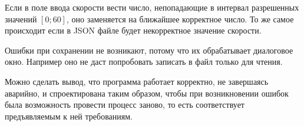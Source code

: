 \documentclass[a4paper,12pt]{article}
\begin{document}
  Если в поле ввода скорости вести число, непопадающие в интервал разрешенных значений $[0; 60]$,
  оно заменяется на ближайшее корректное число.
  То же самое происходит если в JSON файле будет некорректное значение скорости.

  Ошибки при сохранении не возникают, потому что их обрабатывает диалоговое окно.
  Например оно не даст попробовать записать в файл только для чтения. 

  Можно сделать вывод, что программа работает корректно, не завершаясь аварийно, и спроектирована таким образом,
  чтобы при возникновении ошибок была возможность провести процесс заново, то есть соответствует предъявляемым к ней требованиям.

  \begin{CRTbibliography}
  \end{CRTbibliography}

  \CRTterminology

  \CRTlistRegistration
\end{document}

